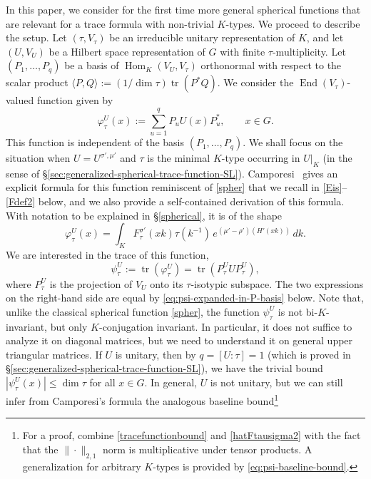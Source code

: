 \documentclass[11pt,oneside]{amsart}
\numberwithin{equation}{section}
\theoremstyle{remark}
\theoremstyle{plain}
\DeclareMathOperator{\tr}{tr}
\DeclareMathOperator{\Hom}{Hom}
\DeclareMathOperator{\End}{End}
\renewcommand\leq{\leqslant}
\begin{document}
In this paper, we consider for the first time more general spherical functions that are relevant for a trace formula with non-trivial $K$-types. We proceed to describe the setup. Let $(\tau,V_\tau)$ be an irreducible unitary representation of $K$, and let $(U,V_U)$ be a Hilbert space representation of $G$ with finite $\tau$-multiplicity. Let $(P_1,\dotsc,P_q)$ be a basis of $\Hom_K(V_U,V_\tau)$ orthonormal with respect to the scalar product $\langle P,Q\rangle:=(1/\dim \tau)\tr(P^*Q)$. We consider the $\End(V_\tau)$-valued function given by
\begin{equation}\label{eq:phidef}
\varphi_\tau^U(x):=\sum_{u=1}^q P_u U(x)P_u^*,\qquad x\in G.
\end{equation}
This function is independent of the basis $(P_1,\dotsc,P_q)$. We shall focus on the situation when $U = U^{\sigma', \mu'}$ and $\tau$ is the minimal $K$-type occurring in $U|_K$ (in the sense of \S\ref{sec:generalized-spherical-trace-function-SL}). Camporesi~\cite{C} gives an explicit formula for this function reminiscent of \eqref{spher} that we recall in \eqref{Eis}--\eqref{Fdef2} below, and we also provide a self-contained derivation of this formula. With notation to be explained in \S\ref{spherical}, it is of the shape
\begin{equation}\label{shape}
\varphi_\tau^{U}(x)=\int_K F_\tau^{\sigma'}(xk)\tau(k^{-1})\,e^{(\mu'-\rho')(H'(xk))}\,dk.
\end{equation}
We are interested in the trace of this function,
\[
\psi^{U}_{\tau} := \tr(\varphi_\tau^U)=\tr(P^U_\tau UP^U_\tau),
\]
where $P^U_\tau$ is the projection of $V_U$ onto its $\tau$-isotypic subspace. The two expressions on the right-hand side are equal by \eqref{eq:psi-expanded-in-P-basis} below. Note that, unlike the classical spherical function \eqref{spher}, the function $\psi^{U}_{\tau}$ is not bi-$K$-invariant, but only $K$-conjugation invariant. In particular, it does not suffice to analyze it on diagonal matrices, but we need to understand it on general upper triangular matrices. If $U$ is unitary, then by $q=[U:\tau]=1$
(which is proved in \S\ref{sec:generalized-spherical-trace-function-SL}), we have the trivial bound
$|\psi^{U}_{\tau}(x)| \leq \dim \tau$ for all $x\in G$. In general, $U$ is not unitary, but we can still infer from Camporesi's formula the analogous baseline bound\footnote{For a proof, combine \eqref{tracefunctionbound} and \eqref{hatFtausigma2} with the fact that
the $\|\cdot\|_{2,1}$ norm is multiplicative under tensor products. A generalization for arbitrary $K$-types is provided by \eqref{eq:psi-baseline-bound}.}
\end{document}
